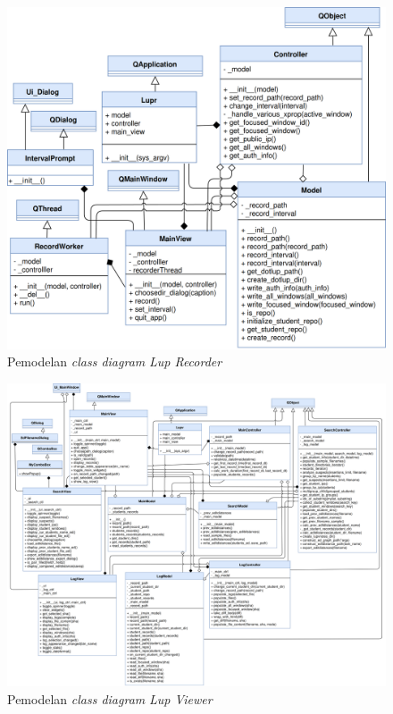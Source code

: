 \begin{figure}[tph]
  \centering
  \includegraphics[width=.9\linewidth]{img/use-case/cd/class-lupr-v1_4}
  \caption{Pemodelan \emph{class diagram} \emph{Lup Recorder}}\label{fig:class-lupr}
\end{figure}

\begin{figure}[tph]
  \centering
  \includegraphics[angle=90,width=1.1\linewidth]{img/use-case/cd/class-lupv-v1_4}
  \caption{Pemodelan \emph{class diagram} \emph{Lup Viewer}}\label{fig:class-lupv}
\end{figure}

